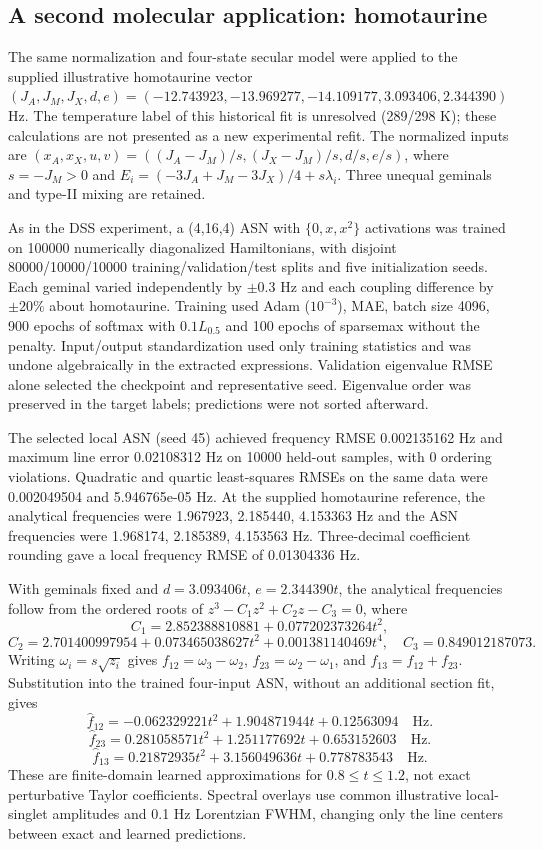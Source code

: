 \subsection{A second molecular application: homotaurine}
The same normalization and four-state secular model were applied to the
supplied illustrative homotaurine vector
$(J_A,J_M,J_X,d,e)=(-12.743923,-13.969277,-14.109177,3.093406,2.344390)$ Hz.
The temperature label of this historical fit is unresolved (289/298 K);
these calculations are not presented as a new experimental refit.
The normalized inputs are $(x_A,x_X,u,v)=((J_A-J_M)/s,(J_X-J_M)/s,d/s,e/s)$,
where $s=-J_M>0$ and $E_i=(-3J_A+J_M-3J_X)/4+s\lambda_i$.
Three unequal geminals and type-II mixing are retained.

As in the DSS experiment, a (4,16,4) ASN with $\{0,x,x^2\}$ activations
was trained on 100000 numerically diagonalized Hamiltonians, with disjoint
80000/10000/10000 training/validation/test splits and five initialization seeds.
Each geminal varied independently by $\pm0.3$ Hz and each coupling difference
by $\pm20\%$ about homotaurine. Training used Adam ($10^{-3}$), MAE,
batch size 4096, 900 epochs of softmax with $0.1L_{0.5}$ and 100 epochs of
sparsemax without the penalty. Input/output standardization used only training
statistics and was undone algebraically in the extracted expressions.
Validation eigenvalue RMSE alone selected the checkpoint and representative seed.
Eigenvalue order was preserved in the target labels; predictions were not sorted afterward.

The selected local ASN (seed 45) achieved frequency RMSE 0.002135162 Hz and maximum line error 0.02108312 Hz on 10000 held-out samples, with 0 ordering violations. Quadratic and quartic least-squares RMSEs on the same data were 0.002049504 and 5.946765e-05 Hz. At the supplied homotaurine reference, the analytical frequencies were 1.967923, 2.185440, 4.153363 Hz and the ASN frequencies were 1.968174, 2.185389, 4.153563 Hz. Three-decimal coefficient rounding gave a local frequency RMSE of 0.01304336 Hz.

With geminals fixed and $d=3.093406t$, $e=2.344390t$, the analytical
frequencies follow from the ordered roots of $z^3-C_1z^2+C_2z-C_3=0$, where
\[C_1=2.852388810881+0.077202373264t^2,\]
\[C_2=2.701400997954+0.073465038627t^2+0.001381140469t^4,\quad C_3=0.849012187073.\]
Writing $\omega_i=s\sqrt{z_i}$ gives $f_{12}=\omega_3-\omega_2$,
$f_{23}=\omega_2-\omega_1$, and $f_{13}=f_{12}+f_{23}$.
Substitution into the trained four-input ASN, without an additional section fit, gives
\[\widehat f_{12}=- 0.062329221 t^{2} + 1.904871944 t + 0.12563094\quad\mathrm{Hz}.\]
\[\widehat f_{23}=0.281058571 t^{2} + 1.251177692 t + 0.653152603\quad\mathrm{Hz}.\]
\[\widehat f_{13}=0.21872935 t^{2} + 3.156049636 t + 0.778783543\quad\mathrm{Hz}.\]
These are finite-domain learned approximations for $0.8\le t\le1.2$,
not exact perturbative Taylor coefficients. Spectral overlays use common
illustrative local-singlet amplitudes and 0.1 Hz Lorentzian FWHM, changing only
the line centers between exact and learned predictions.

